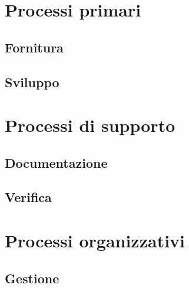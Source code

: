 \documentclass[a4paper,titlepage]{article}
\begin{document}
\newpage
\tableofcontents
\listoffigures
\newpage


\section{Processi primari}
 \subsection{Fornitura}
  
 \subsection{Sviluppo}

  
\section{Processi di supporto}
 \subsection{Documentazione}

 
 \subsection{Verifica}
  
\newpage
\section{Processi organizzativi}
 \subsection{Gestione}
  
\end{document}
